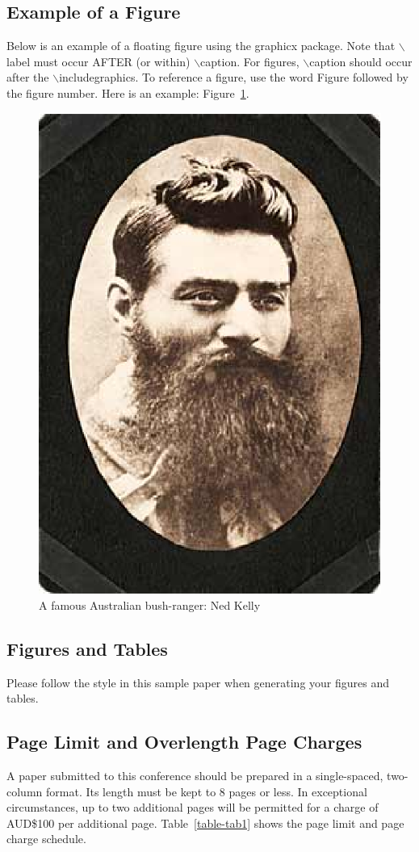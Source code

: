 \documentclass[conference]{IEEEtran}
\begin{document}
\subsection{Example of a Figure}
Below is an example of a floating figure using the graphicx
package.  Note that $\backslash$label must occur AFTER (or within)
$\backslash$caption.  For figures, $\backslash$caption should occur
after the $\backslash$includegraphics.  To reference a figure, use
the word Figure followed by the figure number.  Here is an example:
Figure~\ref{figure-fig1}.

\begin{figure}[htp]
\centerline{\includegraphics[width=0.6\columnwidth]{NedKelly.eps}}
\caption{A famous Australian bush-ranger: Ned Kelly}
\label{figure-fig1}
\end{figure}

\subsection{Figures and Tables}
Please follow the style in this sample paper when generating your figures
and tables.

\subsection{Page Limit and Overlength Page Charges}
A paper submitted to this conference should be prepared in a
single-spaced, two-column format.  Its length must be kept to 8
pages or less.  In exceptional circumstances, up to two additional
pages will be permitted for a charge of AUD\$100 per additional page.
Table~\ref{table-tab1} shows the page limit and page charge schedule.
\end{document}

